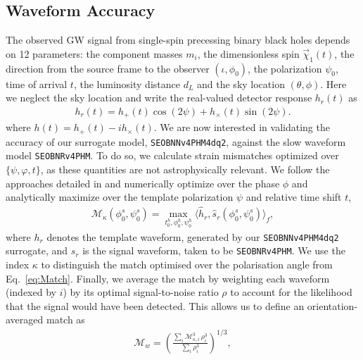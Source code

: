 \documentclass[prd,amssymb,amsmath,amsfonts,superscriptaddress,nofootinbib,reprint,showpacs, longbibliography]{revtex4-1}
\newcommand{\SEOB}{\texttt{SEOBNRv4PHM}}
\newcommand{\SEOBNN}{\texttt{SEOBNN\textunderscore v4PHM\textunderscore4dq2}}
\begin{document}
\subsection{Waveform Accuracy}
\label{subsec:WaveformAccuracy}
The observed GW signal from single-spin precessing binary black holes depends on 12 parameters: the component masses $m_i$, the dimensionless spin $\vec{\chi}_1 (t)$, the direction from the source frame to the observer $(\iota,\phi_0)$, the polarization $\psi_0$, time of arrival $t$, the luminosity distance $d_L$ and the sky location $(\theta,\phi)$. Here we neglect the sky location and write the real-valued detector response $h_r(t)$ as 
\begin{align}
    h_r (t) = h_+ (t) \cos( 2 \psi) + h_{\times} (t) \sin (2 \psi).
\end{align} 
\newline 
where $h(t) = h_+(t) - i h_{\times}(t)$. We are now interested in validating the accuracy of our surrogate model, \SEOBNN, against the slow waveform model \SEOB{}. To do so, we calculate strain mismatches optimized over $\lbrace \psi, \varphi, t \rbrace$, as these quantities are not astrophysically relevant. We follow the approaches detailed in \cite{Schmidt:2014iyl,Harry:2016ijz,Pratten:2020ceb,Ossokine:2020kjp} and numerically optimize over the phase $\phi$ and analytically maximize over the template polarization $\psi$ and relative time shift $t$,
\begin{align}
    \mathcal{M}_{\kappa} (\phi_0^s,\psi^s_0) = \max_{t^h_0,\phi^h_0,\psi^h_0} \langle \hat{h}_r, \hat{s}_r  (\phi_0^s,\psi^s_0)  \rangle_f, 
\end{align}
\newline 
where $h_r$ denotes the template waveform, generated by our \SEOBNN{} surrogate, and $s_r$ is the signal waveform, taken to be \SEOB{}. We use the index $\kappa$ to distinguish the match optimised over the polarisation angle from Eq.~\eqref{eq:Match}.
Finally, we average the match by weighting each waveform (indexed by $i$) by its optimal signal-to-noise ratio $\rho$ to account for the likelihood that the signal would have been detected. This allows us to define an orientation-averaged match as \cite{Harry:2016ijz}
\begin{align}
    \mathcal{M}_{w} = \left( \frac{\sum_i \mathcal{M}_{\kappa,i}^3 \, \rho^3_i }{\sum_i \rho^3_i} \right)^{1/3},
\end{align}
\newline 
\end{document}
